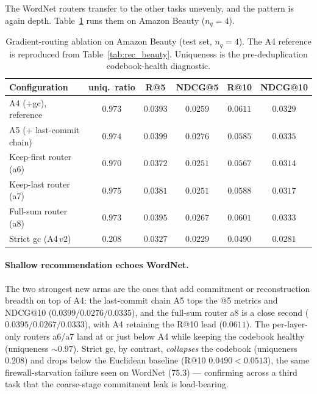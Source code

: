 \documentclass[12pt]{report}
\begin{document}
The WordNet routers transfer to the other tasks unevenly, and the pattern is again depth. Table~\ref{tab:abl_rec} runs them on Amazon Beauty ($n_q=4$).

\begin{table}[h]
\centering
\caption{Gradient-routing ablation on Amazon Beauty (test set, $n_q=4$). The A4 reference is reproduced from Table~\ref{tab:rec_beauty}. Uniqueness is the pre-deduplication codebook-health diagnostic.}
\label{tab:abl_rec}
\begin{tabular}{lccccc}
\hline
Configuration & uniq.\ ratio & R@5 & NDCG@5 & R@10 & NDCG@10 \\
\hline
A4 (+gc), reference & $0.973$ & $0.0393$ & $0.0259$ & $\mathbf{0.0611}$ & $0.0329$ \\
A5 (+ last-commit chain) & $0.974$ & $\mathbf{0.0399}$ & $\mathbf{0.0276}$ & $0.0585$ & $\mathbf{0.0335}$ \\
Keep-first router (a6) & $0.970$ & $0.0372$ & $0.0251$ & $0.0567$ & $0.0314$ \\
Keep-last router (a7) & $0.975$ & $0.0381$ & $0.0251$ & $0.0588$ & $0.0317$ \\
Full-sum router (a8) & $0.973$ & $0.0395$ & $0.0267$ & $0.0601$ & $0.0333$ \\
Strict gc (A4\,$v2$) & $0.208$ & $0.0327$ & $0.0229$ & $0.0490$ & $0.0281$ \\
\hline
\end{tabular}
\end{table}

\paragraph{Shallow recommendation echoes WordNet.} The two strongest new arms are the ones that add commitment or reconstruction breadth on top of A4: the last-commit chain A5 tops the @5 metrics and NDCG@10 ($0.0399/0.0276/0.0335$), and the full-sum router a8 is a close second ($0.0395/0.0267/0.0333$), with A4 retaining the R@10 lead ($0.0611$). The per-layer-only routers a6/a7 land at or just below A4 while keeping the codebook healthy (uniqueness $\sim\!0.97$). Strict gc, by contrast, \emph{collapses} the codebook (uniqueness $0.208$) and drops below the Euclidean baseline (R@10 $0.0490 < 0.0513$), the same firewall-starvation failure seen on WordNet ($75.3$) --- confirming across a third task that the coarse-stage commitment leak is load-bearing.
\end{document}

